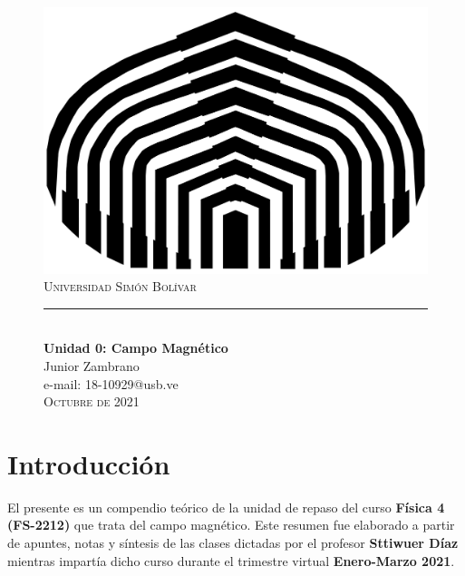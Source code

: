 \documentclass[a4paper,10pt]{article}
\begin{document}
\newcommand{\HRule}{\rule{\linewidth}{0.5mm}}

\begin{figure}[t]
\begin{center}
    \includegraphics[scale=0.07]{USB.png}\\[0.6cm]
    \textsc
    {
        \LARGE Universidad Simón Bolívar \\[0.5cm]
    }
    \HRule \\[0.4cm]
    {\huge \bfseries Unidad 0: Campo Magnético} \\[0.4cm]
    
    Junior Zambrano\\[0.05cm]
    e-mail: 18-10929@usb.ve\\[0.2cm]
    \textsc{
    Octubre de 2021
    }
\end{center}
\end{figure}


\section*{Introducción}

El presente es un compendio teórico de la unidad de repaso del curso
\textbf{Física 4 (FS-2212)} que trata del campo magnético. Este resumen
fue elaborado a partir de apuntes, notas y síntesis de
las clases dictadas por el profesor \textbf{Sttiwuer Díaz} mientras impartía
dicho curso durante el trimestre virtual \textbf{Enero-Marzo 2021}.
\end{document}
